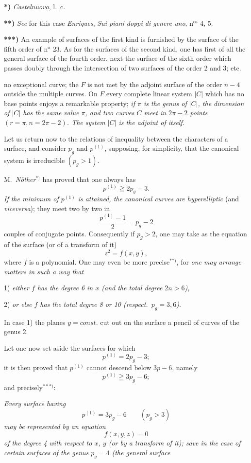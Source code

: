 \documentclass{article}
\begin{document}
\textbf{*)} \emph{Castelnuovo}, l.\ c.

\textbf{**)} \emph{See} for this case \emph{Enriques}, \emph{Sui piani doppi di genere uno}, n${}^{\text{os}}$ 4, 5.

\textbf{***)} An example of surfaces of the first kind is furnished by the surface of the fifth order of n${}^{\text{o}}$ 23. As for the surfaces of the second kind, one has first of all the general surface of the fourth order, next the surface of the sixth order which passes doubly through the intersection of two surfaces of the order 2 and 3; etc.

no exceptional curve; the $F$ is not met by the adjoint surface of the order $n-4$ outside the multiple curves. On $F$ every complete linear system $|C|$ which has no base points enjoys a remarkable property; \emph{if $\pi$ is the genus of $|C|$, the dimension of $|C|$ has the same value $\pi$, and two curves $C$ meet in $2\pi-2$ points $(r=\pi, n=2\pi-2)$. The system $|C|$ is the adjoint of itself.}

Let us return now to the relations of inequality between the characters of a surface, and consider $p_{g}$ and $p^{(1)}$, supposing, for simplicity, that the canonical system is irreducible $(p_{g} > 1)$.

M.\ \emph{Nöther}${}^{*)}$ has proved that one always has
\[ p^{(1)} \geqq 2p_{g} - 3. \]
\emph{If the minimum of $p^{(1)}$ is attained, the canonical curves are hyperelliptic} (and \emph{viceversa}); they meet two by two in
\[ \frac{p^{(1)} - 1}{2} = p_{g} - 2 \]
couples of conjugate points. Consequently if $p_{g} > 2$, one may take as the equation of the surface (or of a transform of it)
\[ z^{2} = f(x, y), \]
where $f$ is a polynomial. One may even be more precise${}^{**)}$, for \emph{one may arrange matters in such a way that}

1) \emph{either $f$ has the degree 6 in $x$ (and the total degree $2n > 6$)},

2) \emph{or else $f$ has the total degree 8 or 10 (respect.\ $p_{g} = 3, 6$)}.

In case 1) the planes $y = const.$ cut out on the surface a pencil of curves of the genus 2.

Let one now set aside the surfaces for which
\[ p^{(1)} = 2p_{g} - 3; \]
it is then proved that $p^{(1)}$ cannot descend below $3p - 6$, namely
\[ p^{(1)} \geqq 3p_{g} - 6; \]
and precisely${}^{***)}$:

\emph{Every surface having}
\[ p^{(1)} = 3p_{g} - 6 \qquad (p_{g} > 3) \]
\emph{may be represented by an equation}
\[ f(x, y, z) = 0 \]
\emph{of the degree 4 with respect to $x$, $y$ (or by a transform of it); save in the case of certain surfaces of the genus $p_{g} = 4$ (the general surface}
\end{document}
